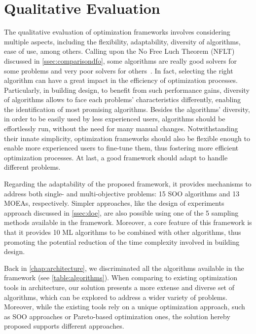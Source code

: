 \section{Qualitative Evaluation}
\label{sec:qualitative}

The qualitative evaluation of optimization frameworks involves considering multiple aspects, including the flexibility, adaptability, diversity of algorithms, ease of use, among others. Calling upon the No Free Luch Theorem (\ac{NFLT}) discussed in \cref{ssec:comparisondfo}, some algorithms are really good solvers for some problems and very poor solvers for others~\cite{Wolpert1997NFLT}. In fact, selecting the right algorithm can have a great impact in the efficiency of optimization processes. Particularly, in building design, to benefit from such performance gains, diversity of algorithms allows to face each problems' characteristics differently, enabling the identification of most promising algorithms. Besides the algorithms' diversity, in order to be easily used by less experienced users, algorithms should be effortlessly run, without the need for many manual changes. Notwithstanding their innate simplicity, optimization frameworks should also be flexible enough to enable more experienced users to fine-tune them, thus fostering more efficient optimization processes. At last, a good framework should adapt to handle different problems.

Regarding the adaptability of the proposed framework, it provides mechanisms to address both single- and multi-objective problems: 15 \ac{SOO} algorithms and 13 \acp{MOEA}, respectively. Simpler approaches, like the design of experiments approach discussed in \cref{ssec:doe}, are also possible using one of the 5 sampling methods available in the framework. Moreover, a core feature of this framework is that it provides 10 \ac{ML} algorithms to be combined with other algorithms, thus  promoting the potential reduction of the time complexity involved in building design. 

Back in \cref{chap:architecture}, we discriminated all the algorithms available in the framework (see \cref{table:algorithms}). When comparing to existing optimization tools in architecture, our solution presents a more extense and diverse set of algorithms, which can be explored to address a wider variety of problems. Moreover, while the existing tools rely on a unique optimization approach, such as \ac{SOO} approaches or Pareto-based optimization ones, the solution hereby proposed supports different approaches.

